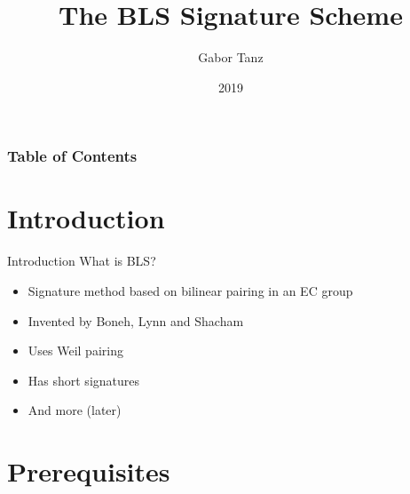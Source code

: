 \documentclass{beamer}
\title[The BLS Signature Scheme]{The BLS Signature Scheme}
\author[Gabor Tanz]{Gabor Tanz}
\institute[BFH]{Berne University of Applied Sciences}
\date[2019]{2019}
\begin{document}
\frame\titlepage

\begin{frame}
	\frametitle{Table of Contents}
	\tableofcontents
\end{frame}

\section{Introduction}
\begin{frame}{Introduction}
	What is BLS?
	\begin{itemize}
		\item Signature method based on bilinear pairing in an EC group
		\item Invented by Boneh, Lynn and Shacham
		\item Uses Weil pairing
		\item Has short signatures
		\item And more (later)
	\end{itemize}
\end{frame}
\section{Prerequisites}
\end{document}
